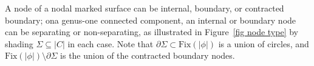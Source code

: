 \documentclass[11pt]{amsart}
\theoremstyle{definition}
\theoremstyle{remark}
\newcommand{\<}{\left<}
\renewcommand{\>}{\right>}
\numberwithin{equation}{section}
\begin{document}
A node of a nodal marked surface can be %
internal, boundary, or %
contracted %
boundary; ona genus-one %
connected component, an internal or boundary node can be separating or non-separating, as illustrated in Figure~\ref{fig node type} by shading $\Sigma \subseteq |C|$ in each case.  Note that ${\partial}\Sigma\subset\text{Fix}(|\phi|)$ is a union of circles, and $\text{Fix}(|\phi|)\setminus{\partial}\Sigma$ is the union of the contracted boundary %
nodes.
\end{document}
